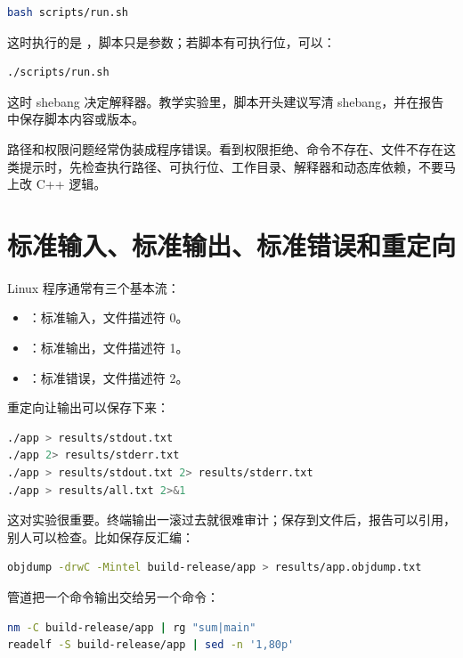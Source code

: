 \begin{lstlisting}[language=bash]
bash scripts/run.sh
\end{lstlisting}

这时执行的是 ，脚本只是参数；若脚本有可执行位，可以：

\begin{lstlisting}[language=bash]
./scripts/run.sh
\end{lstlisting}

这时 shebang 决定解释器。教学实验里，脚本开头建议写清 shebang，并在报告中保存脚本内容或版本。

\begin{warningbox}
路径和权限问题经常伪装成程序错误。看到权限拒绝、命令不存在、文件不存在这类提示时，先检查执行路径、可执行位、工作目录、解释器和动态库依赖，不要马上改 C++ 逻辑。
\end{warningbox}

\section{标准输入、标准输出、标准错误和重定向}

Linux 程序通常有三个基本流：

\begin{itemize}
  \item {}：标准输入，文件描述符 0。
  \item {}：标准输出，文件描述符 1。
  \item {}：标准错误，文件描述符 2。
\end{itemize}

重定向让输出可以保存下来：

\begin{lstlisting}[language=bash]
./app > results/stdout.txt
./app 2> results/stderr.txt
./app > results/stdout.txt 2> results/stderr.txt
./app > results/all.txt 2>&1
\end{lstlisting}

这对实验很重要。终端输出一滚过去就很难审计；保存到文件后，报告可以引用，别人可以检查。比如保存反汇编：

\begin{lstlisting}[language=bash]
objdump -drwC -Mintel build-release/app > results/app.objdump.txt
\end{lstlisting}

管道把一个命令输出交给另一个命令：

\begin{lstlisting}[language=bash]
nm -C build-release/app | rg "sum|main"
readelf -S build-release/app | sed -n '1,80p'
\end{lstlisting}

